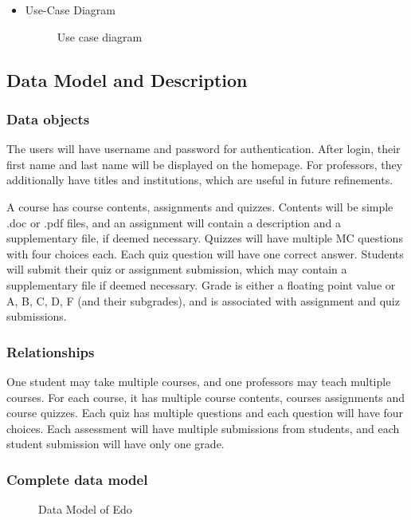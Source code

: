 \documentclass[paper=a4, fontsize=11pt]{scrartcl}
\numberwithin{equation}{section}		%
\numberwithin{figure}{section}			%
\numberwithin{table}{section}				%
\begin{document}
\begin{itemize}
	\item Use-Case Diagram
	\begin{figure}[!ht]
		\begin{center}
		\end{center}
		\caption{Use case diagram}
	\end{figure}
	
\end{itemize}



\subsection{Data Model and Description}

\subsubsection{Data objects}
The users will have username and password for authentication. After login, their first name and last name will be displayed on the homepage. For professors, they additionally have titles and institutions, which are useful in future refinements.

A course has course contents, assignments and quizzes. Contents will be simple .doc or .pdf files, and an assignment will contain a description and a supplementary file, if deemed necessary. Quizzes will have multiple MC questions with four choices each. Each quiz question will have one correct answer. Students will submit their quiz or assignment submission, which may contain a supplementary file if deemed necessary. Grade is either a floating point value or A, B, C, D, F (and their subgrades), and is associated with assignment and quiz submissions.

\subsubsection{Relationships}
One student may take multiple courses, and one professors may teach multiple courses. For each course, it has multiple course contents, courses assignments and course quizzes. Each quiz has multiple questions and each question will have four choices. Each assessment will have multiple submissions from students, and each student submission will have only one grade. 

\subsubsection{Complete data model}
\begin{figure}[!ht]
	\begin{center}
	\end{center}
	\caption{Data Model of Edo}
\end{figure}
\end{document}
